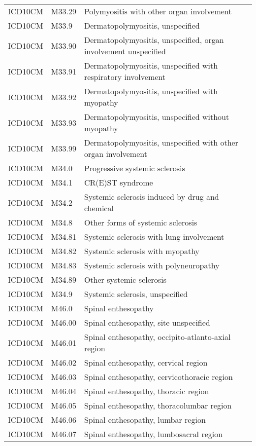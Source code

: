 \begin{longtable}{p{}p{}p{}}
  ICD10CM & M33.29 & Polymyositis with other organ involvement \\ 
  ICD10CM & M33.9 & Dermatopolymyositis, unspecified \\ 
  ICD10CM & M33.90 & Dermatopolymyositis, unspecified, organ involvement unspecified \\ 
  ICD10CM & M33.91 & Dermatopolymyositis, unspecified with respiratory involvement \\ 
  ICD10CM & M33.92 & Dermatopolymyositis, unspecified with myopathy \\ 
  ICD10CM & M33.93 & Dermatopolymyositis, unspecified without myopathy \\ 
  ICD10CM & M33.99 & Dermatopolymyositis, unspecified with other organ involvement \\ 
  ICD10CM & M34.0 & Progressive systemic sclerosis \\ 
  ICD10CM & M34.1 & CR(E)ST syndrome \\ 
  ICD10CM & M34.2 & Systemic sclerosis induced by drug and chemical \\ 
  ICD10CM & M34.8 & Other forms of systemic sclerosis \\ 
  ICD10CM & M34.81 & Systemic sclerosis with lung involvement \\ 
  ICD10CM & M34.82 & Systemic sclerosis with myopathy \\ 
  ICD10CM & M34.83 & Systemic sclerosis with polyneuropathy \\ 
  ICD10CM & M34.89 & Other systemic sclerosis \\ 
  ICD10CM & M34.9 & Systemic sclerosis, unspecified \\ 
  ICD10CM & M46.0 & Spinal enthesopathy \\ 
  ICD10CM & M46.00 & Spinal enthesopathy, site unspecified \\ 
  ICD10CM & M46.01 & Spinal enthesopathy, occipito-atlanto-axial region \\ 
  ICD10CM & M46.02 & Spinal enthesopathy, cervical region \\ 
  ICD10CM & M46.03 & Spinal enthesopathy, cervicothoracic region \\ 
  ICD10CM & M46.04 & Spinal enthesopathy, thoracic region \\ 
  ICD10CM & M46.05 & Spinal enthesopathy, thoracolumbar region \\ 
  ICD10CM & M46.06 & Spinal enthesopathy, lumbar region \\ 
  ICD10CM & M46.07 & Spinal enthesopathy, lumbosacral region \\ 

\end{longtable}
